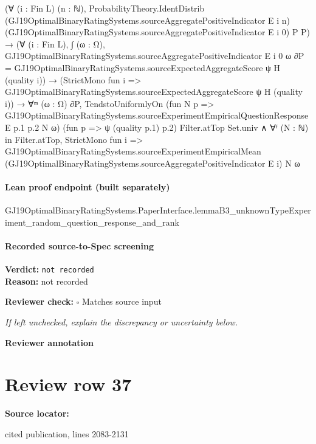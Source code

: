 \documentclass[10pt]{article}
\newcommand{\reviewerbox}{%
  \par\noindent\fbox{\parbox{0.96\linewidth}{\rule{0pt}{0.38in}}}\par
}
\newcommand{\reviewmatch}[1]{%
  \par\noindent\textbf{Reviewer check:} $\square$\; #1\par
  \noindent\emph{If left unchecked, explain the discrepancy or uncertainty below.}\par
}
\begin{document}
\begin{ReviewVerbatim}
                        (∀ (i : Fin L) (n : ℕ),
                            ProbabilityTheory.IdentDistrib
                              (GJ19OptimalBinaryRatingSystems.sourceAggregatePositiveIndicator E i n)
                              (GJ19OptimalBinaryRatingSystems.sourceAggregatePositiveIndicator E i 0) P P) →
                          (∀ (i : Fin L),
                              ∫ (ω : Ω), GJ19OptimalBinaryRatingSystems.sourceAggregatePositiveIndicator E i 0 ω ∂P =
                                GJ19OptimalBinaryRatingSystems.sourceExpectedAggregateScore ψ H (quality i)) →
                            (StrictMono fun i =>
                                GJ19OptimalBinaryRatingSystems.sourceExpectedAggregateScore ψ H (quality i)) →
                              ∀ᵐ (ω : Ω) ∂P,
                                TendstoUniformlyOn
                                    (fun N p =>
                                      GJ19OptimalBinaryRatingSystems.sourceExperimentEmpiricalQuestionResponse E p.1 p.2
                                        N ω)
                                    (fun p => ψ (quality p.1) p.2) Filter.atTop Set.univ ∧
                                  ∀ᶠ (N : ℕ) in Filter.atTop,
                                    StrictMono fun i =>
                                      GJ19OptimalBinaryRatingSystems.sourceExperimentEmpiricalMean
                                        (GJ19OptimalBinaryRatingSystems.sourceAggregatePositiveIndicator E i) N ω
\end{ReviewVerbatim}

\paragraph{Lean proof endpoint (built separately)}\begin{ReviewVerbatim}
GJ19OptimalBinaryRatingSystems.PaperInterface.lemmaB3_unknownTypeExperiment_random_question_response_and_rank
\end{ReviewVerbatim}

\paragraph{Recorded source-to-Spec screening}
\textbf{Verdict:} \texttt{not recorded}
\\
\textbf{Reason:} not recorded
\reviewmatch{Matches source input}
\noindent\textbf{Reviewer annotation}\par
\reviewerbox
\clearpage
\hypertarget{source-claim-7ea3c8ab498f92dc}{}
\section*{Review row 37}
\textbf{Source locator:} {\footnotesize\raggedright cited publication, lines 2083-\allowbreak{}2131\par}
\end{document}
